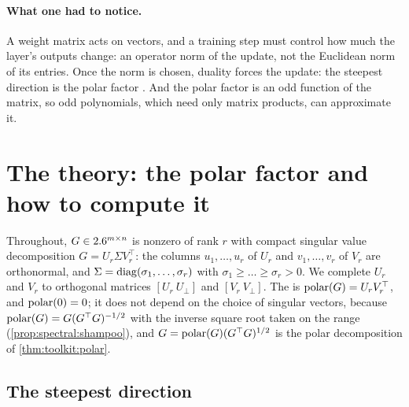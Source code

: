 \begin{refsection}
\paragraph{What one had to notice.} A weight matrix acts on vectors, and a training step must control how much the layer's outputs change: an operator norm of the update, not the Euclidean norm of its entries. Once the norm is chosen, duality forces the update: the steepest direction is the polar factor \parencite{CarlsonEtAl2015a,BernsteinNewhouse2024}. And the polar factor is an odd function of the matrix, so odd polynomials, which need only matrix products, can approximate it.

\section{The theory: the polar factor and how to compute it}\label{sec:spectral:theory}

Throughout, $G\in2.6^{m\times n}$ is nonzero of rank $r$ with compact singular value decomposition $G=U_r\Sigma V_r^\top$: the columns $u_1,\dots,u_r$ of $U_r$ and $v_1,\dots,v_r$ of $V_r$ are orthonormal, and $\Sigma=\operatorname{diag}(\sigma_1,\dots,\sigma_r)$ with $\sigma_1\ge\dots\ge\sigma_r>0$. We complete $U_r$ and $V_r$ to orthogonal matrices $[U_r\ U_\perp]$ and $[V_r\ V_\perp]$. The  is $\operatorname{polar}(G)=U_rV_r^\top$, and $\operatorname{polar}(0)=0$; it does not depend on the choice of singular vectors, because $\operatorname{polar}(G)=G(G^\top G)^{-1/2}$ with the inverse square root taken on the range (\cref{prop:spectral:shampoo}), and $G=\operatorname{polar}(G)(G^\top G)^{1/2}$ is the polar decomposition of \cref{thm:toolkit:polar}.

\subsection{The steepest direction}


\end{refsection}
